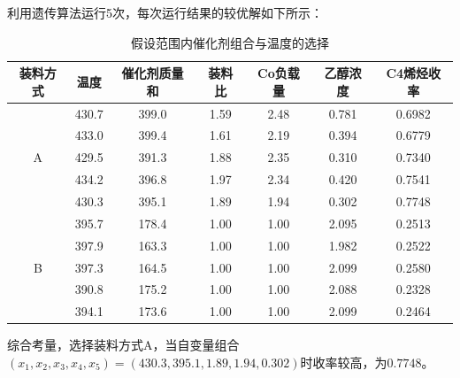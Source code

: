 \documentclass{article}
\begin{document}
	\newpage
	利用遗传算法运行5次，每次运行结果的较优解如下所示：
	\begin{table}[!h]
		\centering
		\caption{假设范围内催化剂组合与温度的选择}
		\begin{tabular}{|c|c|c|c|c|c|c|}
			\hline
			装料方式               & 温度    & 催化剂质量和 & 装料比 & Co负载量 & 乙醇浓度  & C4烯烃收率 \\ \hline
			\multirow{5}{*}{A} & 430.7 & 399.0  & 1.59           & 2.48  & 0.781 & 0.6982 \\ \cline{2-7} 
			& 433.0 & 399.4  & 1.61           & 2.19  & 0.394 & 0.6779 \\ \cline{2-7} 
			& 429.5 & 391.3  & 1.88           & 2.35  & 0.310 & 0.7340 \\ \cline{2-7} 
			& 434.2 & 396.8  & 1.97           & 2.34  & 0.420 & 0.7541 \\ \cline{2-7} 
			& 430.3 & 395.1  & 1.89           & 1.94  & 0.302 & 0.7748 \\ \hline
			\multirow{5}{*}{B} & 395.7 & 178.4  & 1.00           & 1.00  & 2.095 & 0.2513 \\ \cline{2-7} 
			& 397.9 & 163.3  & 1.00           & 1.00  & 1.982 & 0.2522 \\ \cline{2-7} 
			& 397.3 & 164.5  & 1.00           & 1.00  & 2.099 & 0.2580 \\ \cline{2-7} 
			& 390.8 & 175.2  & 1.00           & 1.00  & 2.088 & 0.2328 \\ \cline{2-7} 
			& 394.1 & 173.6  & 1.00           & 1.00  & 2.099 & 0.2464 \\ \hline
		\end{tabular}
	\end{table}

	综合考量，选择装料方式A，当自变量组合$(x_1,x_2,x_3,x_4,x_5)=(430.3,395.1,1.89,1.94,0.302)$时收率较高，为$0.7748$。
	
\end{document}
